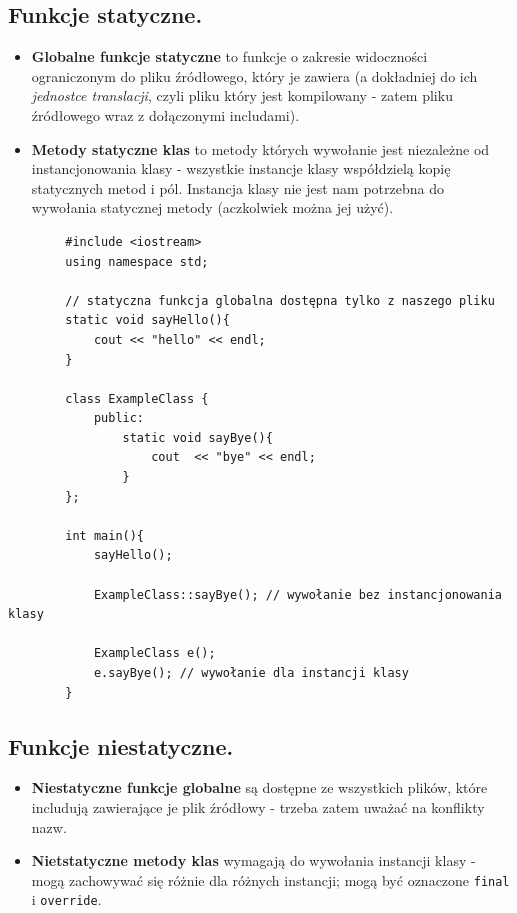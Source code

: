 \documentclass[12pt]{article}
\begin{document}
    \subsection{Funkcje statyczne.}
    \begin{itemize}
        \item \textbf{Globalne funkcje statyczne} to funkcje o zakresie widoczności ograniczonym do pliku źródłowego, który je
        zawiera (a dokładniej do ich \textit{jednostce translacji}, czyli pliku który jest kompilowany - zatem pliku
        źródłowego wraz z dołączonymi includami).
        \item \textbf{Metody statyczne klas} to metody których wywołanie jest niezależne od instancjonowania klasy -
        wszystkie instancje klasy współdzielą kopię statycznych metod i pól. Instancja klasy nie jest nam potrzebna
        do wywołania statycznej metody (aczkolwiek można jej użyć).
    \end{itemize}

    \begin{verbatim}
        #include <iostream>
        using namespace std;

        // statyczna funkcja globalna dostępna tylko z naszego pliku
        static void sayHello(){
            cout << "hello" << endl;
        }

        class ExampleClass {
            public:
                static void sayBye(){
                    cout  << "bye" << endl;
                }
        };

        int main(){
            sayHello();

            ExampleClass::sayBye(); // wywołanie bez instancjonowania klasy

            ExampleClass e();
            e.sayBye(); // wywołanie dla instancji klasy
        }
    \end{verbatim}

    \subsection{Funkcje niestatyczne.}
    \begin{itemize}
        \item \textbf{Niestatyczne funkcje globalne} są dostępne ze wszystkich plików, które includują zawierające
        je plik źródłowy - trzeba zatem uważać na konflikty nazw.
        \item \textbf{Nietstatyczne metody klas} wymagają do wywołania instancji klasy - mogą zachowywać się różnie
        dla różnych instancji; mogą być oznaczone \texttt{final} i \texttt{override}.
    \end{itemize}
\end{document}
